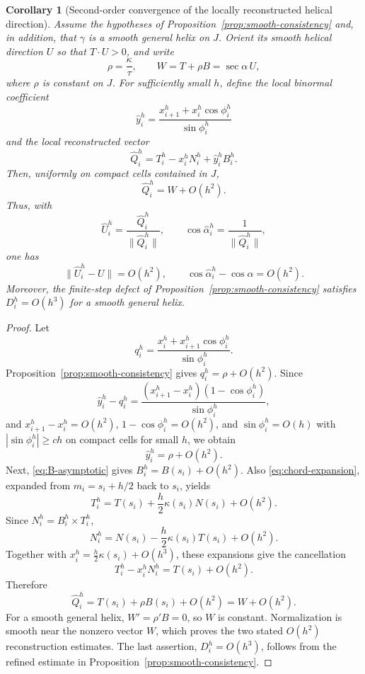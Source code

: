 \documentclass[10pt,a4paper]{amsart}
\newtheorem{corollary}[theorem]{Corollary}
\theoremstyle{definition}
\theoremstyle{remark}
\numberwithin{equation}{section}
\begin{document}
\begin{corollary}[Second-order convergence of the locally reconstructed helical direction]\label{cor:axis-smooth-convergence}
Assume the hypotheses of Proposition~\ref{prop:smooth-consistency} and, in addition, that $\gamma$ is a smooth general helix on $J$. Orient its smooth helical direction $U$ so that $T\cdot U>0$, and write
\[
\rho=\frac{\kappa}{\tau},
\qquad
W=T+\rho B=\sec\alpha\,U,
\]
where $\rho$ is constant on $J$. For sufficiently small $h$, define the local binormal coefficient
\[
\widehat y_i^h
=
\frac{x_{i+1}^h+x_i^h\cos\phi_i^h}{\sin\phi_i^h}
\]
and the local reconstructed vector
\[
\widehat Q_i^h
=
T_i^h-x_i^hN_i^h+\widehat y_i^hB_i^h.
\]
Then, uniformly on compact cells contained in $J$,
\[
\widehat Q_i^h=W+O(h^2).
\]
Thus, with
\[
\widehat U_i^h=\frac{\widehat Q_i^h}{\|\widehat Q_i^h\|},
\qquad
\cos\widehat\alpha_i^h=\frac1{\|\widehat Q_i^h\|},
\]
one has
\[
\boxed{\ \|\widehat U_i^h-U\|=O(h^2),\qquad
\cos\widehat\alpha_i^h-\cos\alpha=O(h^2).\ }
\]
Moreover, the finite-step defect of Proposition~\ref{prop:smooth-consistency} satisfies $D_i^h=O(h^3)$ for a smooth general helix.
\end{corollary}

\begin{proof}
Let
\[
q_i^h=\frac{x_i^h+x_{i+1}^h\cos\phi_i^h}{\sin\phi_i^h}.
\]
Proposition~\ref{prop:smooth-consistency} gives $q_i^h=\rho+O(h^2)$. Since
\[
\widehat y_i^h-q_i^h
=
\frac{(x_{i+1}^h-x_i^h)(1-\cos\phi_i^h)}{\sin\phi_i^h},
\]
and $x_{i+1}^h-x_i^h=O(h^2)$, $1-\cos\phi_i^h=O(h^2)$, and $\sin\phi_i^h=O(h)$ with $|\sin\phi_i^h|\ge c h$ on compact cells for small $h$, we obtain
\[
\widehat y_i^h=\rho+O(h^2).
\]
Next, \eqref{eq:B-asymptotic} gives $B_i^h=B(s_i)+O(h^2)$. Also \eqref{eq:chord-expansion}, expanded from $m_i=s_i+h/2$ back to $s_i$, yields
\[
T_i^h=T(s_i)+\frac h2\kappa(s_i)N(s_i)+O(h^2).
\]
Since $N_i^h=B_i^h\times T_i^h$,
\[
N_i^h=N(s_i)-\frac h2\kappa(s_i)T(s_i)+O(h^2).
\]
Together with $x_i^h=\frac h2\kappa(s_i)+O(h^3)$, these expansions give the cancellation
\[
T_i^h-x_i^hN_i^h=T(s_i)+O(h^2).
\]
Therefore
\[
\widehat Q_i^h
=T(s_i)+\rho B(s_i)+O(h^2)
=W+O(h^2).
\]
For a smooth general helix, $W'=\rho'B=0$, so $W$ is constant. Normalization is smooth near the nonzero vector $W$, which proves the two stated $O(h^2)$ reconstruction estimates. The last assertion, $D_i^h=O(h^3)$, follows from the refined estimate in Proposition~\ref{prop:smooth-consistency}.
\end{proof}
\end{document}
